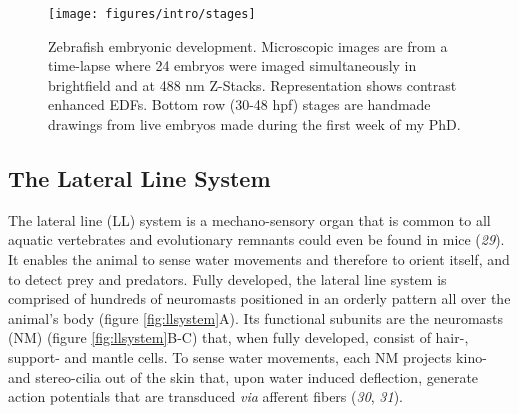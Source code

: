 \documentclass[11pt,singlespacinge,twoside]{reedthesis} %
\theoremstyle{definition}
\theoremstyle{definition}
\theoremstyle{definition}
\theoremstyle{remark}
\begin{document}
\begin{figure}

{\centering \texttt{[image: figures/intro/stages]} 

}

\caption[Zebrafish embryonic development]{Zebrafish embryonic development. Microscopic images are from a time-lapse where 24 embryos were imaged simultaneously in brightfield and at 488 nm Z-Stacks. Representation shows contrast enhanced EDFs. Bottom row (30-48 hpf) stages are handmade drawings from live embryos made during the first week of my PhD.}\label{fig:stages}
\end{figure}
\hypertarget{the-lateral-line-system}{%
\subsection{The Lateral Line System}\label{the-lateral-line-system}}

The lateral line (LL) system is a mechano-sensory organ that is common to all aquatic vertebrates and evolutionary remnants could even be found in mice (\emph{29}). It enables the animal to sense water movements and therefore to orient itself, and to detect prey and predators. Fully developed, the lateral line system is comprised of hundreds of neuromasts positioned in an orderly pattern all over the animal's body (figure \ref{fig:llsystem}A). Its functional subunits are the neuromasts (NM) (figure \ref{fig:llsystem}B-C) that, when fully developed, consist of hair-, support- and mantle cells. To sense water movements, each NM projects kino- and stereo-cilia out of the skin that, upon water induced deflection, generate action potentials that are transduced \emph{via} afferent fibers (\emph{30}, \emph{31}).
\end{document}
